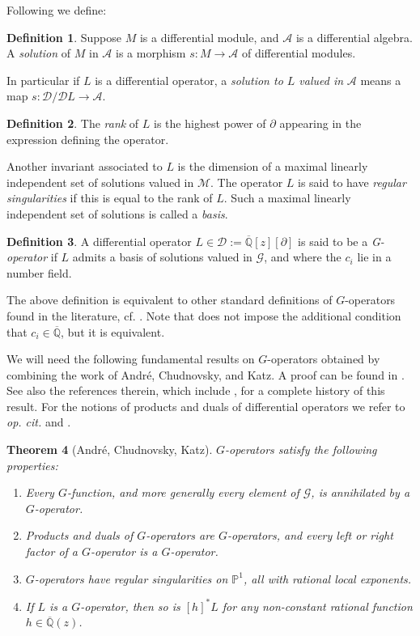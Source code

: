 \documentclass[10pt]{article}
\numberwithin{equation}{section}
\theoremstyle{plain}
\newtheorem{thm}{Theorem}[section]
\theoremstyle{definition}
\newtheorem{defn}[thm]{Definition}
\theoremstyle{remark}
\newcommand{\Qbar}{\overline{\mathbb{Q}}}
\begin{document}
Following \cite[\S2.2]{zbMATH01485629} we define:

\begin{defn}
Suppose $M$ is a differential module, and $\mathcal{A}$ is a differential algebra. A \emph{solution} of $M$ in $\mathcal{A}$ is a morphism $s : M \to \mathcal{A}$ of differential modules.
\end{defn}

\noindent In particular if $L$ is a differential operator, a \emph{solution to $L$ valued in} $\mathcal{A}$ means a map $s : \mathcal{D} / \mathcal{D} L \to \mathcal{A}$. 

\begin{defn}
    The \emph{rank} of $L$ is the highest power of $\partial$ appearing in the expression defining the operator. 
\end{defn}

Another invariant associated to $L$ is the dimension of a maximal linearly independent set of solutions valued in $\mathcal{M}$. The operator $L$ is said to have \emph{regular singularities} if this is equal to the rank of $L$. Such a maximal linearly independent set of solutions is called a \emph{basis}.
\begin{defn}
\label{Gopdef}
A differential operator $L \in \mathcal{D} := \Qbar[z][\partial]$ is said to be a \emph{G-operator} if $L$ admits a basis of solutions valued in  $\mathcal{G}$, and where the $c_{i}$ lie in a number field.
\end{defn}

\noindent The above definition is equivalent to other standard definitions of $G$-operators found in the literature, cf. \cite[Sec. 1.6]{zbMATH07441738}. Note that \cite[Sec. 1.6]{zbMATH07441738} does not impose the additional condition that $c_{i} \in \Qbar$, but it is equivalent. 

We will need the following fundamental results on $G$-operators obtained by combining the work of André, Chudnovsky, and Katz. A proof can be found in \cite[Thm. 1.8]{zbMATH07441738}. See also the references therein, which include \cite{zbMATH03893285, zbMATH03985372}, for a complete history of this result. For the notions of products and duals of differential operators we refer to \emph{op. cit.} and \cite[Ch. 2]{zbMATH01860838}.

\begin{thm}[André, Chudnovsky, Katz]\label{ACK}
$G$-operators satisfy the following properties:
\begin{enumerate}
\item Every $G$-function, and more generally every element of $\mathcal{G}$, is annihilated by a $G$-operator.
\item Products and duals of $G$-operators are $G$-operators, and every left or right factor of a $G$-operator is a $G$-operator.
\item $G$-operators have regular singularities on $\mathbb{P}^1$, all with rational local exponents.
\item If $L$ is a $G$-operator, then so is $[h]^*L$ for any non-constant rational function $h \in \overline{\mathbb{Q}}(z)$.
\end{enumerate}
\end{thm}
\end{document}
